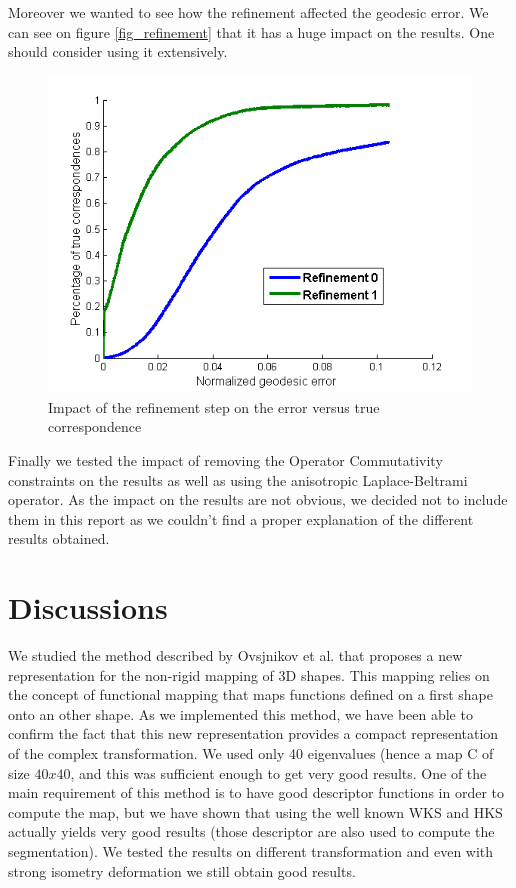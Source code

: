 \documentclass[10pt,twocolumn,letterpaper]{article}
\begin{document}
Moreover we wanted to see how the refinement affected the geodesic error. We can see on figure \ref{fig_refinement} that it has a huge impact on the results. One should consider using it extensively.

\begin{figure}[h]
\centering
\includegraphics[width=.4\textwidth]{Images/refinement.png}
\caption{Impact of the refinement step on the error versus true correspondence}
\label{refinement}
\end{figure}

Finally we tested the impact of removing the Operator Commutativity constraints on the results as well as using the anisotropic Laplace-Beltrami operator. As the impact on the results are not obvious, we decided not to include them in this report as we couldn't find a proper explanation of the different results obtained.
 

\section{Discussions} %
We studied the method described by Ovsjnikov et al. that proposes a new representation for the non-rigid mapping of 3D shapes. This mapping relies on the concept of functional mapping that maps functions defined on a first shape onto an other shape. As we implemented this method, we have been able to confirm the fact that this new representation provides a compact representation of the complex transformation. We used only 40 eigenvalues (hence a map C of size $40x40$, and this was sufficient enough to get very good results. One of the main requirement of this method is to have good descriptor functions in order to compute the map, but we have shown that using the well known WKS and HKS actually yields very good results (those descriptor are also used to compute the segmentation). We tested the results on different transformation and even with strong isometry deformation we still obtain good results.


{\small


}
\end{document}
